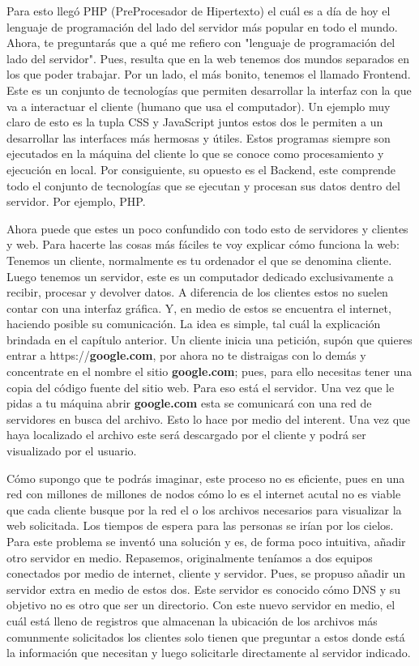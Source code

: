 \documentclass[12pt, letterpaper]{article}
\begin{document}
Para esto llegó PHP (PreProcesador de Hipertexto) el cuál es a día de hoy el lenguaje de programación del lado del servidor más popular en todo el
mundo. Ahora, te preguntarás que a qué me refiero con "lenguaje de programación del lado del servidor". Pues, resulta que en la web tenemos dos
mundos separados en los que poder trabajar. Por un lado, el más bonito, tenemos el llamado Frontend. Este es un conjunto de tecnologías que permiten
desarrollar la interfaz con la que va a interactuar el cliente (humano que usa el computador). Un ejemplo muy claro de esto es la tupla CSS y JavaScript
juntos estos dos le permiten a un desarrollar las interfaces más hermosas y útiles. Estos programas siempre son ejecutados en la máquina del cliente
lo que se conoce como procesamiento y ejecución en local. Por consiguiente, su opuesto es el Backend, este comprende todo el conjunto de tecnologías
que se ejecutan y procesan sus datos dentro del servidor. Por ejemplo, PHP.

Ahora puede que estes un poco confundido con todo esto de servidores y clientes y web. Para hacerte las cosas más fáciles te voy explicar cómo
funciona la web: Tenemos un cliente, normalmente es tu ordenador el que se denomina cliente. Luego tenemos un servidor, este es un computador dedicado
exclusivamente a recibir, procesar y devolver datos. A diferencia de los clientes estos no suelen contar con una interfaz gráfica. Y, en medio de 
estos se encuentra el internet, haciendo posible su comunicación. La idea es simple, tal cuál la explicación brindada en el capítulo anterior.
Un cliente inicia una petición, supón que quieres entrar a https://\textbf{google.com}, por ahora no te distraigas con lo demás y concentrate en el
nombre el sitio \textbf{google.com}; pues, para ello necesitas tener una copia del código fuente del sitio web. Para eso está el servidor. Una vez que
le pidas a tu máquina abrir \textbf{google.com} esta se comunicará con una red de servidores en busca del archivo. Esto lo hace por medio del interent.
Una vez que haya localizado el archivo este será descargado por el cliente y podrá ser visualizado por el usuario. 

Cómo supongo que te podrás imaginar, este proceso no es eficiente, pues en una red con millones de millones de nodos cómo lo es el internet acutal
no es viable que cada cliente busque por la red el o los archivos necesarios para visualizar la web solicitada. Los tiempos de espera para las personas
se irían por los cielos. Para este problema se inventó una solución y es, de forma poco intuitiva, añadir otro servidor en medio. Repasemos, originalmente
teníamos a dos equipos conectados por medio de internet, cliente y servidor. Pues, se propuso añadir un servidor extra en medio de estos dos. Este servidor
es conocido cómo DNS y su objetivo no es otro que ser un directorio. Con este nuevo servidor en medio, el cuál está lleno de registros que almacenan la
ubicación de los archivos más comunmente solicitados los clientes solo tienen que preguntar a estos donde está la información que necesitan y luego
solicitarle directamente al servidor indicado. 
\end{document}

